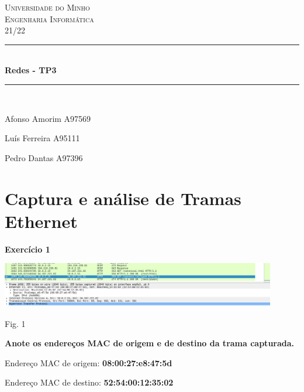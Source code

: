 \documentclass{article}
\begin{document}
	\begin{centering}
    \vspace*{0.5 cm}
    \textsc{\LARGE Universidade do Minho}\\[2.0 cm]	%
	\textsc{\LARGE Engenharia Informática}\\[1 cm]				%
	\textsc{\large 21/22}\\[0.5 cm]				%
	\rule{\linewidth}{0.2 mm} \\[0.4 cm]
	{ \huge \bfseries Redes - TP3}
	\rule{\linewidth}{0.2 mm} \\[1.5 cm]
		\begin{minipage}{0.4\textwidth}
		\begin{flushright}\large
		\begin{raggedright}
		Afonso Amorim A97569\par
		Luís Ferreira A95111\par
		Pedro Dantas  A97396\par
		\end{raggedright}
		\end{flushright}
	\end{minipage}
	\end{centering}
\clearpage
\tableofcontents
\cleardoublepage

\section{Captura e análise de Tramas Ethernet}\vspace{0.5cm}
\textbf{Exercício 1}

\vspace{0.5cm}
\begin{center}
\includegraphics[width = 12cm]{1.png}

\caption{Fig. 1}
\end{center}

\vspace{0.5cm}
\textbf{Anote os endereços MAC de origem e de destino da trama capturada.}\par\vspace{0.35cm}
Endereço MAC de origem: \textbf{08:00:27:e8:47:5d}

Endereço MAC de destino: \textbf{52:54:00:12:35:02}
\end{document}
